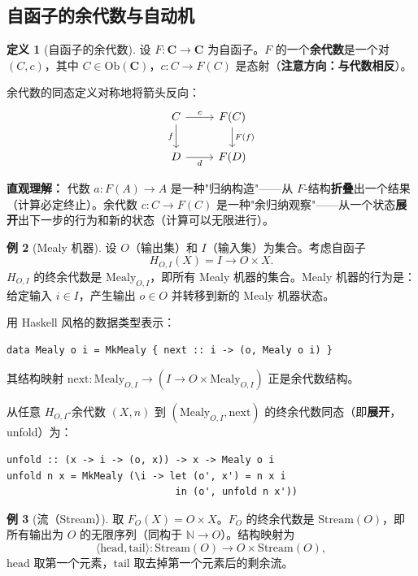 \documentclass[12pt,a4paper]{ctexart}
\theoremstyle{definition}
\newtheorem{definition}{定义}[section]
\newtheorem{example}[definition]{例}
\newcommand{\cat}[1]{\mathbf{#1}}
\newcommand{\Stream}{\mathrm{Stream}}
\newcommand{\Mealy}{\mathrm{Mealy}}
\newcommand{\ob}[1]{\mathrm{Ob}(#1)}
\begin{document}
\subsection{自函子的余代数与自动机}

\begin{definition}[自函子的余代数]\label{def:endo-coalg}
设 $F:\cat C\to\cat C$ 为自函子。$F$ 的一个\textbf{余代数}是一个对 $(C,c)$，其中 $C\in\ob{\cat C}$，$c:C\to F(C)$ 是态射（\textbf{注意方向：与代数相反}）。
\end{definition}

余代数的同态定义对称地将箭头反向：
\[
\begin{tikzcd}
C \arrow[r,"c"] \arrow[d,"f"'] & F(C) \arrow[d,"F(f)"] \\
D \arrow[r,"d"'] & F(D)
\end{tikzcd}
\]

\textbf{直观理解：} 代数 $a:F(A)\to A$ 是一种"归纳构造"——从 $F$-结构\textbf{折叠}出一个结果（计算必定终止）。余代数 $c:C\to F(C)$ 是一种"余归纳观察"——从一个状态\textbf{展开}出下一步的行为和新的状态（计算可以无限进行）。

\begin{example}[Mealy 机器]\label{ex:mealy}
设 $O$（输出集）和 $I$（输入集）为集合。考虑自函子
\[H_{O,I}(X)=I\to O\times X.\]
$H_{O,I}$ 的终余代数是 $\Mealy_{O,I}$，即所有 Mealy 机器的集合。Mealy 机器的行为是：给定输入 $i\in I$，产生输出 $o\in O$ 并转移到新的 Mealy 机器状态。

用 Haskell 风格的数据类型表示：
\begin{verbatim}
data Mealy o i = MkMealy { next :: i -> (o, Mealy o i) }
\end{verbatim}
其结构映射 $\mathrm{next}:\Mealy_{O,I}\to(I\to O\times\Mealy_{O,I})$ 正是余代数结构。

从任意 $H_{O,I}$-余代数 $(X,n)$ 到 $(\Mealy_{O,I},\mathrm{next})$ 的终余代数同态（即\textbf{展开}，unfold）为：
\begin{verbatim}
unfold :: (x -> i -> (o, x)) -> x -> Mealy o i
unfold n x = MkMealy (\i -> let (o', x') = n x i
                             in (o', unfold n x'))
\end{verbatim}
\end{example}

\begin{example}[流（Stream）]\label{ex:stream}
取 $F_O(X)=O\times X$。$F_O$ 的终余代数是 $\Stream(O)$，即所有输出为 $O$ 的无限序列（同构于 $\mathbb N\to O$）。结构映射为
\[\langle\mathrm{head},\mathrm{tail}\rangle:\Stream(O)\longrightarrow O\times\Stream(O),\]
$\mathrm{head}$ 取第一个元素，$\mathrm{tail}$ 取去掉第一个元素后的剩余流。
\end{example}
\end{document}
